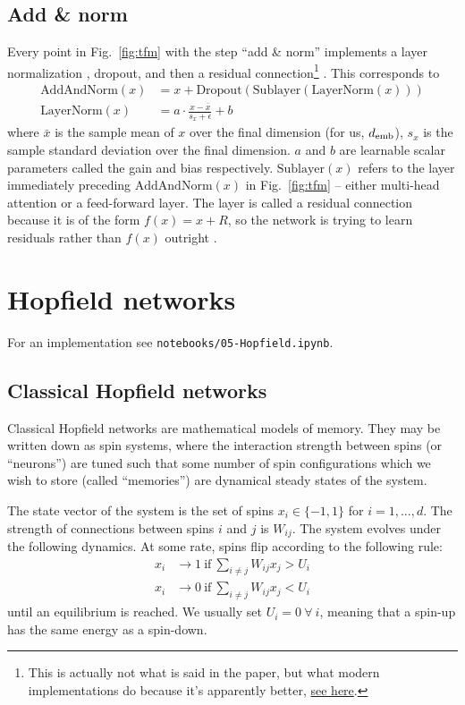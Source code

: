\documentclass[11pt]{article}
\numberwithin{equation}{section}
\begin{document}
\subsection{Add \& norm} \label{sec:add_and_norm}
Every point in Fig.~\ref{fig:tfm} with the step ``add \& norm'' implements a layer normalization \citep{Ba16}, dropout, and then a residual connection\footnote{This is actually not what is said in the paper, but what modern implementations do because it's apparently better, \href{https://github.com/OpenNMT/OpenNMT-py/issues/770}{see here}.} \citep{He16}. This corresponds to
\begin{align}
\text{AddAndNorm}(x) &= x + \text{Dropout}(\text{Sublayer}(\text{LayerNorm}(x))) \\
\text{LayerNorm}(x) &= a \cdot \frac{x - \bar{x}}{s_x + \epsilon} + b
\end{align}
where $\bar{x}$ is the sample mean of $x$ over the final dimension (for us, $d_{\text{emb}}$), $s_x$ is the sample standard deviation over the final dimension. $a$ and $b$ are learnable scalar parameters called the gain and bias respectively. $\text{Sublayer}(x)$ refers to the layer immediately preceding $\text{AddAndNorm}(x)$ in Fig.~\ref{fig:tfm} -- either multi-head attention or a feed-forward layer. The layer is called a residual connection because it is of the form $f(x) = x + R$, so the network is trying to learn residuals rather than $f(x)$ outright \citep{He16}.


\section{Hopfield networks}

For an implementation see \verb+notebooks/05-Hopfield.ipynb+.

\subsection{Classical Hopfield networks}

Classical Hopfield networks \citep{Hopfield82} are mathematical models of memory. They may be written down as spin systems, where the interaction strength between spins (or ``neurons'') are tuned such that some number of spin configurations which we wish to store (called ``memories'') are dynamical steady states of the system.

The state vector of the system is the set of spins $x_i \in \{-1, 1\}$ for $i=1,...,d$. The strength of connections between spins $i$ and $j$ is $W_{ij}$. The system evolves under the following dynamics. At some rate, spins flip according to the following rule:
\begin{align}
x_i &\rightarrow 1\ \text{if}\ \sum_{i \neq j} W_{ij} x_j > U_i \\
x_i &\rightarrow 0\ \text{if}\ \sum_{i \neq j} W_{ij} x_j < U_i
\end{align}
until an equilibrium is reached. We usually set $U_i=0\ \forall\ i$, meaning that a spin-up has the same energy as a spin-down.
\end{document}

